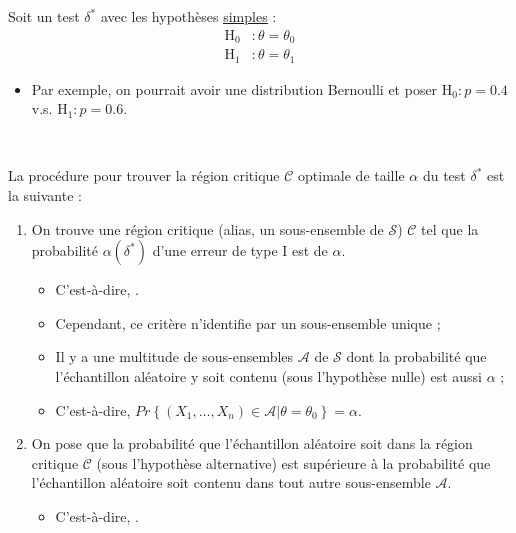 \documentclass[10pt, french]{article}
\begin{document}
\begin{multicols*}{2}
\begin{definitionNOHFILLprop}[Tests optimaux]


Soit un test $\delta^{*}$ avec les hypothèses \hyperlink{hyp-simple}{\color{blue!80!white}\underline{simples}} :
\begin{align*}
	\mathrm{H}_{0}	&:	\theta	=	\theta_{0}	\\
	\mathrm{H}_{1}	&:	\theta	=	\theta_{1}
\end{align*}
\begin{itemize}
	\item	Par exemple, on pourrait avoir une distribution Bernoulli et poser $\mathrm{H}_{0}	:	p	=	0.4$ v.s. $\mathrm{H}_{1}	:	p	=	0.6$.
\end{itemize}
\

La procédure pour trouver la région critique $\mathcal{C}$ optimale de taille $\alpha$ du test $\delta^{\ast}$ est la suivante :
\begin{enumerate}
	\item	On trouve une région critique (alias, un sous-ensemble de $\mathcal{S}$) $\mathcal{C}$ tel que la probabilité $\alpha(\delta^{\ast})$ d'une erreur de type I est de $\alpha$.
		\begin{itemize}
		\item	C'est-à-dire, .
		\item	Cependant, ce critère n'identifie par un sous-ensemble unique ;
		\item	Il y a une multitude de sous-ensembles $\mathcal{A}$ de $\mathcal{S}$ dont la probabilité que l'échantillon aléatoire y soit contenu (sous l'hypothèse nulle) est aussi $\alpha$ ;
		\item	C'est-à-dire, $Pr\left\{(X_{1}, \dots, X_{n}) \in \mathcal{A}| \theta	=	\theta_{0}	\right\}	=	\alpha$.
		\end{itemize}
	\item	On pose que la probabilité que l'échantillon aléatoire soit dans la région critique $\mathcal{C}$ (sous l'hypothèse alternative) est supérieure à la probabilité que l'échantillon aléatoire soit contenu dans tout autre sous-ensemble $\mathcal{A}$.
		\begin{itemize}
		\item	C'est-à-dire,  .
		\end{itemize}
\end{enumerate}


\end{definitionNOHFILLprop}
\end{multicols*}
\end{document}
